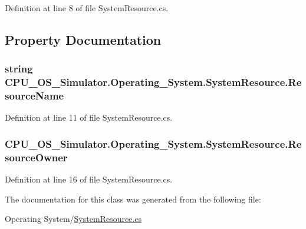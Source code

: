 Definition at line 8 of file System\+Resource.\+cs.



\subsection{Property Documentation}
\hypertarget{class_c_p_u___o_s___simulator_1_1_operating___system_1_1_system_resource_a8960fd4248d2a386e02166ab5deb107f}{}
\subsubsection[{Resource\+Name}]{\setlength{\rightskip}{0pt plus 5cm}string C\+P\+U\+\_\+\+O\+S\+\_\+\+Simulator.\+Operating\+\_\+\+System.\+System\+Resource.\+Resource\+Name\hspace{0.3cm}{\ttfamily [get]}}\label{class_c_p_u___o_s___simulator_1_1_operating___system_1_1_system_resource_a8960fd4248d2a386e02166ab5deb107f}


Definition at line 11 of file System\+Resource.\+cs.

\hypertarget{class_c_p_u___o_s___simulator_1_1_operating___system_1_1_system_resource_aeb8029700d1acf805ec2be0a5d4acb41}{}
\subsubsection[{Resource\+Owner}]{ C\+P\+U\+\_\+\+O\+S\+\_\+\+Simulator.\+Operating\+\_\+\+System.\+System\+Resource.\+Resource\+Owner\hspace{0.3cm}{\ttfamily [get]}}\label{class_c_p_u___o_s___simulator_1_1_operating___system_1_1_system_resource_aeb8029700d1acf805ec2be0a5d4acb41}


Definition at line 16 of file System\+Resource.\+cs.



The documentation for this class was generated from the following file\+:\begin{DoxyCompactItemize}
\item 
Operating System/\hyperlink{_system_resource_8cs}{System\+Resource.\+cs}\end{DoxyCompactItemize}
